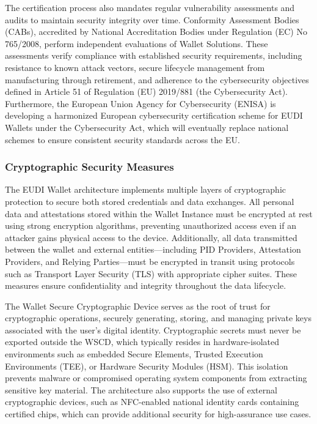 \documentclass[sigconf,balance,nonacm,authordraft]{acmart}
\begin{document}
The certification process also mandates regular vulnerability assessments and audits to maintain security integrity over time. Conformity Assessment Bodies (CABs), accredited by National Accreditation Bodies under Regulation (EC) No 765/2008, perform independent evaluations of Wallet Solutions. These assessments verify compliance with established security requirements, including resistance to known attack vectors, secure lifecycle management from manufacturing through retirement, and adherence to the cybersecurity objectives defined in Article 51 of Regulation (EU) 2019/881 (the Cybersecurity Act). Furthermore, the European Union Agency for Cybersecurity (ENISA) is developing a harmonized European cybersecurity certification scheme for EUDI Wallets under the Cybersecurity Act, which will eventually replace national schemes to ensure consistent security standards across the EU.

\subsubsection{Cryptographic Security Measures}

The EUDI Wallet architecture implements multiple layers of cryptographic protection to secure both stored credentials and data exchanges. All personal data and attestations stored within the Wallet Instance must be encrypted at rest using strong encryption algorithms, preventing unauthorized access even if an attacker gains physical access to the device. Additionally, all data transmitted between the wallet and external entities—including PID Providers, Attestation Providers, and Relying Parties—must be encrypted in transit using protocols such as Transport Layer Security (TLS) with appropriate cipher suites. These measures ensure confidentiality and integrity throughout the data lifecycle.

The Wallet Secure Cryptographic Device serves as the root of trust for cryptographic operations, securely generating, storing, and managing private keys associated with the user's digital identity. Cryptographic secrets must never be exported outside the WSCD, which typically resides in hardware-isolated environments such as embedded Secure Elements, Trusted Execution Environments (TEE), or Hardware Security Modules (HSM). This isolation prevents malware or compromised operating system components from extracting sensitive key material. The architecture also supports the use of external cryptographic devices, such as NFC-enabled national identity cards containing certified chips, which can provide additional security for high-assurance use cases.
\end{document}
